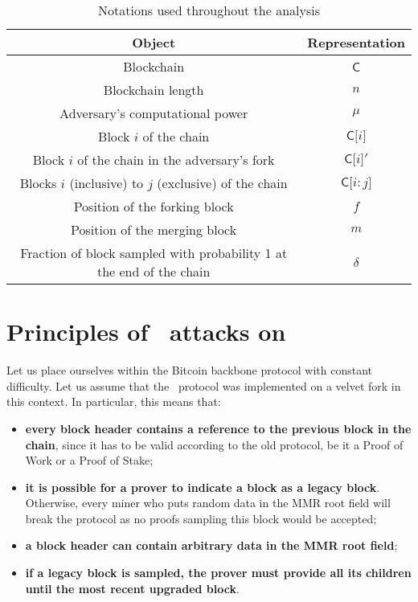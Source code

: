       \begin{table}[ht]
        \centering
        \begin{tabular}{|c|c|}
          \hline
          Object & Representation\\
          \hline
          Blockchain & \(\mathsf{C}\)\\
          \hline
          Blockchain length &  \(n\)\\
          \hline
          Adversary's computational power &  \(\mu\)\\
          \hline
          Block  \(i\) of the chain &  \(\mathsf{C[}i\mathsf{]}\)\\
          \hline
          Block \(i\) of the chain in the adversary's fork & \(\mathsf{C[}i\mathsf{]}'\)\\
          \hline
          Blocks \(i\) (inclusive) to  \(j\) (exclusive) of the chain &  \(\mathsf{C[}i\mathsf{:}j\mathsf{]}\)\\
          \hline
          Position of the forking block & \(f\)\\
          \hline
          Position of the merging block &  \(m\)\\
          \hline
          Fraction of block sampled with probability 1 at the end of the chain & \(\delta\)\\
          \hline
        \end{tabular}
        \caption{Notations used throughout the analysis}
        \label{table:notations}
      \end{table} 
    \section[Principles of \cs\ attacks]{Principles of \cs\ attacks on \FC}
      \label{section:attack}
      Let us place ourselves within the Bitcoin backbone protocol with constant difficulty. Let us assume that the \FC\ protocol was implemented on a velvet fork in this context. In particular, this means that:

      \begin{itemize}
        \item \textbf{every block header contains a reference to the previous block in the chain}, since it has to be valid according to the old protocol, be it a Proof of Work or a Proof of Stake;
        \item \textbf{it is possible for a prover to indicate a block as a legacy block}. Otherwise, every miner who puts random data in the MMR root field will break the protocol as no proofs sampling this block would be accepted;
        \item \textbf{a block header can contain arbitrary data in the MMR root field};
        \item \textbf{if a legacy block is sampled, the prover must provide all its children until the most recent upgraded block}.
      \end{itemize}
      
